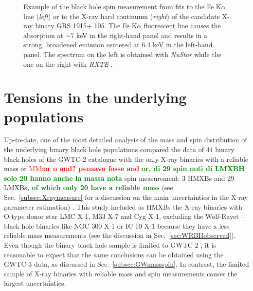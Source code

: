 \documentclass[a4paper,titlepage]{book}     	%
\newcommand{\micmap}[1]{\textcolor{red}{MM:\bf#1}}
\newcommand{\erika}[1]{\textcolor{green}{\bf#1}}
\begin{document}
\begin{figure}
\begin{minipage}{.49\textwidth}
	\end{minipage}
	\caption{Example of the black hole spin measurement from fits to the Fe K$\alpha$ line (\emph{left}) or to the X-ray hard continuum (\emph{right}) of the candidate X-ray binary GRS 1915+ 105. The Fe K$\alpha$ fluorescent line causes the absorption at $\sim 7$ keV in the right-hand panel and results in a strong, broadened emission centered at 6.4 keV in the left-hand panel. The spectrum on the left is obtained with \textit{NuStar} while the one on the right with \textit{RXTE} \cite{GSR1915_lowhardXstate}.}\label{fig:spinmeasure}
\end{figure}


\section{Tensions in the underlying populations}%
Up-to-date, one of the most detailed analysis of the mass and spin distribution of the underlying binary black hole populations compared the data of 44 binary black holes of the GWTC-2 catalogue with the only X-ray binaries with a reliable mass or \micmap{or o and? pensavo fosse and} \erika{or, di 29 spin noti di LMXBH solo 20 hanno anche la massa nota} spin measurement: 3 HMXBs and 29 LMXBs\erika{, of which only 20 have a reliable mass}  (see Sec.\ \ref{subsec:Xraymeasure} for a discussion on the main uncertainties in the X-ray parameter estimation) \cite{HMXBH_spins2021}. This study included as HMXBs the X-ray binaries with O-type donor star LMC X-1, M33 X-7 and Cyg X-1, excluding the Wolf-Rayet -- black hole binaries like NGC 300 X-1 or IC 10 X-1 because they have a less reliable mass measurements \cite{ICX10X-1_Laycock2015_revisited} (see the discussion in Sec.\ \ref{sec:WRBHobserved}). Even though the binary black hole sample is limited to GWTC-2 \cite{GWTC-2}, it is reasonable to expect that the same conclusions can be obtained using the GWTC-3 data, as discussed in Sec.\ \ref{subsec:GWmassspin}. In contrast, the limited sample of X-ray binaries with reliable mass and spin measurements causes the largest uncertainties.
\end{document}
